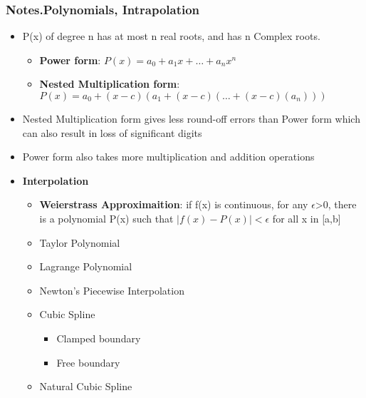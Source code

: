 \documentclass[12pt,letterpaper]{article}
\newcommand\asgnname{Notes}         %
\newenvironment{answer}[1]{
  \subsubsection*{%
  \asgnname.#1}
}{\newpage}
\begin{document}
\begin{answer}{Polynomials, Intrapolation}
\begin{itemize}
    \item P(x) of degree n has at most n real roots, and has n Complex roots.
    \begin{itemize}
        \item \textbf{Power form}: $P(x) = a_0 + a_1x + \ldots + a_nx^n$
        \item \textbf {Nested Multiplication form}: $P(x) = a_0 + (x-c)(a_1+ (x-c)(\ldots+(x-c)(a_n)))$
    \end{itemize}
    \item Nested Multiplication form gives less round-off errors than Power form which can also result in loss of significant digits
    \item Power form also takes more multiplication and addition operations
    \item \textbf {Interpolation}
    \begin{itemize}
        \item \textbf{Weierstrass Approximaition}: if f(x) is continuous, for any $\epsilon$>0, there is a polynomial P(x) such that $\mid f(x)-P(x)\mid <\epsilon$ for all x in [a,b]
        \item Taylor Polynomial
        \item Lagrange Polynomial
        \item Newton's Piecewise Interpolation
        \item Cubic Spline
        \begin{itemize}
            \item Clamped boundary
            \item Free boundary
        \end{itemize}
        \item Natural Cubic Spline
    \end{itemize}
\end{itemize}
\end{answer}
\end{document}
